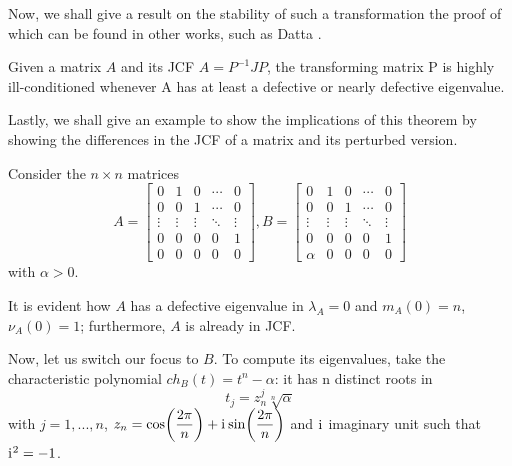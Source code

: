Now, we shall give a result on the stability of such a transformation the proof of which can be found in other works, such as
Datta \cite{biswadatta}.

\begin{theorem}\label{thm:stability-jcf}
    Given a matrix \(A\) and its JCF \(A = P^{-1}JP\), the transforming matrix P is highly ill-conditioned
    whenever A has at least a defective or nearly defective eigenvalue.
\end{theorem}

Lastly, we shall give an example to show the implications of this theorem by showing the differences in
the JCF of a matrix and its perturbed version.

\begin{example}
Consider the \(n \times n\) matrices
\[
    A =
    \begin{bmatrix}
            0       &      1       &    0     &   \cdots   &    0    \\
            0       &      0       &    1     &   \cdots   &    0    \\
        \vdots      &    \vdots    &  \vdots  &   \ddots   & \vdots  \\
            0       &       0      &     0    &     0      &    1    \\
            0       &       0      &     0    &     0      &    0
    \end{bmatrix},
    B =
    \begin{bmatrix}
        0       &      1       &    0     &   \cdots   &    0    \\
        0       &      0       &    1     &   \cdots   &    0    \\
     \vdots     &    \vdots    &  \vdots  &   \ddots   & \vdots  \\
        0       &       0      &     0    &     0      &    1    \\
      \alpha    &       0      &     0    &     0      &    0
    \end{bmatrix}
\]
with \(\alpha > 0\).

It is evident how \(A\) has a defective eigenvalue in \(\lambda_{A} = 0\) and \(m_{A}(0) = n\), \(\nu_{A}(0) = 1\); furthermore,
\(A\) is already in JCF.

Now, let us switch our focus to \(B\). To compute its eigenvalues, take the characteristic polynomial
\(ch_{B}(t) = t^n - \alpha\): it has n distinct roots in
\[
    t_{j} = z_{n}^{j} \sqrt[n]{\alpha}
\]
with \(j = 1, ..., n\), \(z_{n} = \cos(\dfrac{2\pi}{n}) + \mathrm{i}\mkern1mu \sin(\dfrac{2\pi}{n})\) and
\(\mathrm{i}\mkern1mu\) imaginary unit such that \(\mathrm{i}\mkern1mu^2 = -1\).


\end{example}
